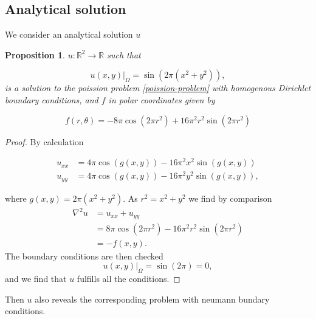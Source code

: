 \documentclass[5p,a4paper,english]{elsarticle}%
\newcommand\restr[2]{\ensuremath{\left.#1\right|_{#2}}}
\newtheorem{proposition}[theorem]{Proposition}
\begin{document}
\subsection{Analytical solution}
We consider an analytical solution $u$
\begin{proposition}
    
    $u: \mathbb{R}^2 \rightarrow \mathbb{R}$ such that

    \begin{equation}
    \restr{u(x,y)}{\Omega} = \sin(2\pi (x^2 + y^2)),
    \label{analytical-solution}
    \end{equation}
    is a solution to the poission problem \eqref{poission-problem} with homogenous Dirichlet boundary conditions, and  $f$ in polar coordinates given by

    \begin{equation*}
    f(r,\theta) = -8\pi\cos(2\pi r^2) + 16 \pi^2r^2 \sin(2\pi r^2)
    \end{equation*}
\end{proposition}
\begin{proof}
By calculation

\begin{equation*}
\begin{aligned}
 u_{xx} &= 4\pi\cos(g(x,y)) - 16\pi^2x^2\sin(g(x,y))
\\
u_{yy} &= 4\pi\cos(g(x,y)) - 16\pi^2y^2\sin(g(x,y)),
\end{aligned}
\end{equation*}

where $ g(x,y) = 2\pi (x^2 + y^2)$. 
As $r^2 = x^2 + y^2$ we find by comparison
\begin{equation*}
\begin{aligned}
\nabla^2 u &= u_{xx} + u_{yy}\\
&= 8\pi \cos(2\pi r^2) - 16\pi^2r^2\sin(2\pi r^2)\\
& = -f(x,y).
\end{aligned}
\end{equation*}
The boundary conditions are then checked
\begin{equation*}
    \restr{u(x,y)}{\Omega} = \sin(2\pi) = 0,
\end{equation*}
and we find that $u$ fulfills all the conditions. 
\end{proof}
Then $u$ also reveals the corresponding problem with neumann bundary conditions. 
\end{document}
